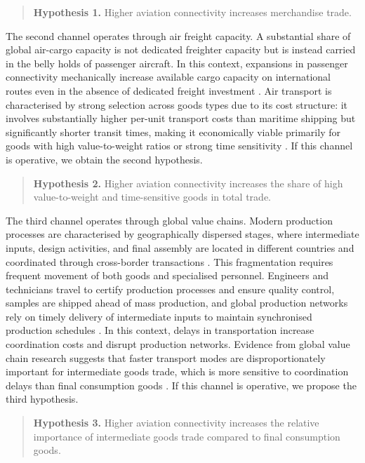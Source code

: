 \begin{quote}
\textbf{Hypothesis 1.} Higher aviation connectivity increases merchandise
trade.
\end{quote}

The second channel operates through air freight capacity. A substantial share
of global air-cargo capacity is not dedicated freighter capacity but is
instead carried in the belly holds of passenger aircraft. In this context,
expansions in passenger connectivity mechanically increase available cargo
capacity on international routes even in the absence of dedicated freight
investment \citep{IATA_cargo}. Air transport is characterised by strong
selection across goods types due to its cost structure: it involves
substantially higher per-unit transport costs than maritime shipping but
significantly shorter transit times, making it economically viable primarily
for goods with high value-to-weight ratios or strong time sensitivity
\citep{Hummels_2013,Harrigan_2010}. If this channel is operative, we obtain
the second hypothesis.

\begin{quote}
\textbf{Hypothesis 2.} Higher aviation connectivity increases the share of
high value-to-weight and time-sensitive goods in total trade.
\end{quote}

The third channel operates through global value chains. Modern production
processes are characterised by geographically dispersed stages, where
intermediate inputs, design activities, and final assembly are located in
different countries and coordinated through cross-border transactions
\citep{Henderson_2002}. This fragmentation requires frequent movement of both
goods and specialised personnel. Engineers and technicians travel to certify
production processes and ensure quality control, samples are shipped ahead of
mass production, and global production networks rely on timely delivery of
intermediate inputs to maintain synchronised production schedules
\citep{Antras_2013}. In this context, delays in transportation increase
coordination costs and disrupt production networks. Evidence from global
value chain research suggests that faster transport modes are
disproportionately important for intermediate goods trade, which is more
sensitive to coordination delays than final consumption goods
\citep{Johnson_2017}. If this channel is operative, we propose the third
hypothesis.

\begin{quote}
\textbf{Hypothesis 3.} Higher aviation connectivity increases the relative
importance of intermediate goods trade compared to final consumption goods.
\end{quote}

